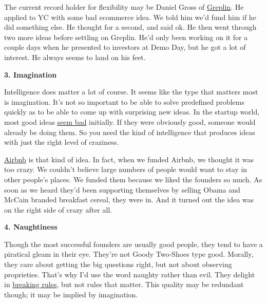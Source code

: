 The
                    current record holder for flexibility may be Daniel Gross of
                    \href{http://greplin.com}{Greplin}. He applied to YC
                    with some bad ecommerce idea. We told him we'd fund him if
                    he did something else. He thought for a second, and said ok.
                    He then went through two more ideas before settling on
                    Greplin. He'd only been working on it for a couple days when
                    he presented to investors at Demo Day, but he got a lot of
                    interest. He always seems to land on his feet.


                    \textbf{3. Imagination}

Intelligence does matter a
                    lot of course. It seems like the type that matters most is
                    imagination. It's not so important to be able to solve
                    predefined problems quickly as to be able to come up with
                    surprising new ideas. In the startup world, most good ideas
                    \href{http://www.paulgraham.com/googles.html}{seem bad} initially. If they were
                    obviously good, someone would already be doing them. So you
                    need the kind of intelligence that produces ideas with just
                    the right level of craziness.

\href{http://airbnb.com}{Airbnb}
                    is that kind of idea. In fact, when we funded Airbnb, we
                    thought it was too crazy. We couldn't believe large numbers
                    of people would want to stay in other people's places. We
                    funded them because we liked the founders so much. As soon
                    as we heard they'd been supporting themselves by selling
                    Obama and McCain branded breakfast cereal, they were in. And
                    it turned out the idea was on the right side of crazy after
                    all.


                    \textbf{4. Naughtiness}

Though the most successful
                    founders are usually good people, they tend to have a
                    piratical gleam in their eye. They're not Goody Two-Shoes
                    type good. Morally, they care about getting the big
                    questions right, but not about observing proprieties. That's
                    why I'd use the word naughty rather than evil. They delight
                    in \href{http://www.paulgraham.com/gba.html}{breaking rules}, but not rules that
                    matter. This quality may be redundant though; it may be
                    implied by imagination.

